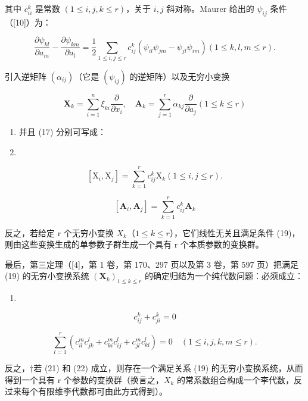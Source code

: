 其中 \(c_{ii}^{k}\) 是常数 \((1\leqslant i,j,k\leqslant r)\)，关于 \(i,j\) 斜对称。Maurer 给出的 \(\psi_{ij}\) 条件（{[}10{]}）为：

\[
\frac {\partial \psi_ {k l}}{\partial a _ {m}} - \frac {\partial \psi_ {k m}}{\partial a _ {l}} = \frac {1}{2} \sum_ {1 \leqslant i, j \leqslant r} c _ {i j} ^ {k} (\psi_ {i l} \psi_ {j m} - \psi_ {j l} \psi_ {i m}) (1 \leqslant k, l, m \leqslant r).\tag{17}
\]

引入逆矩阵 \((\alpha_{ij})\)（它是 \((\psi_{ij})\) 的逆矩阵）以及无穷小变换

\[
\mathbf {X} _ {k} = \sum_ {i = 1} ^ {n} \xi_ {k i} \frac {\partial}{\partial x _ {i}}, \quad \mathbf {A} _ {k} = \sum_ {j = 1} ^ {r} \alpha_ {k j} \frac {\partial}{\partial a _ {j}} (1 \leqslant k \leqslant r)\tag{18}
\]

\begin{enumerate}
\def\labelenumi{(\arabic{enumi})}
\setcounter{enumi}{15}
\item
  并且 (17) 分别可写成：
\item
\end{enumerate}

\[
[ \mathrm{X} _ {i}, \mathrm{X} _ {j} ] = \sum_ {k = 1} ^ {r} c _ {i j} ^ {k} \mathrm{X} _ {k} (1 \leqslant i, j \leqslant r).\tag{20}
\]

\[
[ \mathbf {A} _ {i}, \mathbf {A} _ {j} ] = \sum_ {k = 1} ^ {r} c _ {i j} ^ {k} \mathbf {A} _ {k}
\]

反之，若给定 r 个无穷小变换 \(X_{k}\)（\(1 \leqslant k \leqslant r\)），它们线性无关且满足条件 (19)，则由这些变换生成的单参数子群生成一个具有 r 个本质参数的变换群。

最后，第三定理（{[}4{]}，第 1 卷，第 170、297 页以及第 3 卷，第 597 页）把满足 (19) 的无穷小变换系统 \((\mathbf{X}_k)_{1 \leqslant k \leqslant r}\) 的确定归结为一个纯代数问题：必须成立：

\begin{enumerate}
\def\labelenumi{(\arabic{enumi})}
\setcounter{enumi}{20}
\tightlist
\item
\end{enumerate}

\[
c _ {i j} ^ {k} + c _ {j i} ^ {k} = 0\tag{22}
\]

\[
\sum_ {l = 1} ^ {r} \left(c _ {i l} ^ {m} c _ {j k} ^ {l} + c _ {k i} ^ {m} c _ {i j} ^ {l} + c _ {j l} ^ {m} c _ {k l} ^ {l}\right) = 0 \quad (1 \leqslant i, j, k, m \leqslant r).
\]

反之，†若 (21) 和 (22) 成立，则存在一个满足关系 (19) 的无穷小变换系统，从而得到一个具有 r 个参数的变换群（换言之，\(X_{k}\) 的常系数组合构成一个李代数，反过来每个有限维李代数都可由此方式得到）。

